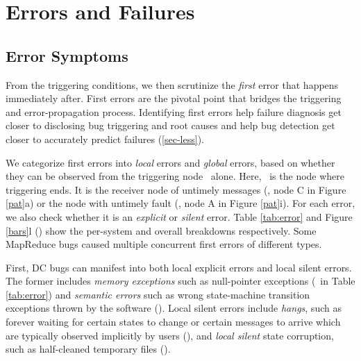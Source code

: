 



\section{Errors and Failures}
\label{sec-err}

\subsection{Error Symptoms}
\label{err-err}

From the triggering conditions, we then scrutinize the {\em first}
error that happens immediately after.  First errors are the pivotal
point that bridges the triggering and error-propagation process.
Identifying first errors help failure diagnosis get closer to
disclosing bug triggering and root causes and help bug detection get
closer to accurately predict failures (\sec\ref{sec-less}).




We categorize first errors into {\em local} errors and {\em global}
errors, based on whether they can be observed from the triggering node
\nt\ alone.  Here, \nt\ is the node where triggering ends.  It is the
receiver node of untimely messages (\eg, node C in Figure \ref{pat}a)
or the node with untimely fault (\eg, node A in Figure \ref{pat}i).
For each error, we also check whether it is an {\it explicit} or {\em
  silent} error.  
Table \ref{tab:error} and Figure \ref{bars}l
(\BERR) show the per-system and overall breakdowns
respectively. 
Some MapReduce bugs caused multiple concurrent first errors of different types.

\fi


First, DC bugs can manifest into both local explicit errors and local
silent errors. The former includes
%
{\em memory exceptions} such as null-pointer exceptions
(\pctErrLocMem\ in Table \ref{tab:error}) and {\em semantic errors} 
such as wrong state-machine transition exceptions thrown by 
the software (\pctErrLocSem).
%
Local silent errors include
%
{\em hangs}, such as forever waiting for certain states to change
or certain messages to arrive which are typically observed implicitly
by users (\pctErrLocHang),
%
and {\em local silent} state corruption, such as half-cleaned
temporary files (\pctErrLocSil).



